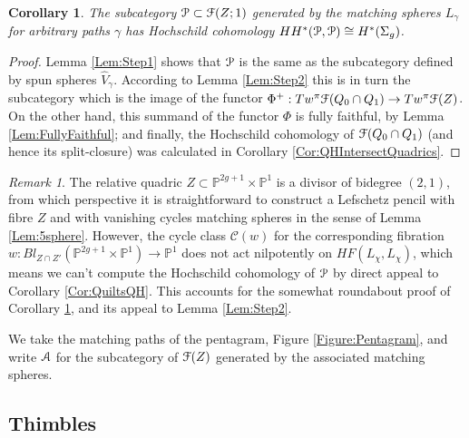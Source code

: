\documentclass[reqno,10pt]{amsart}
\numberwithin{equation}{section}
\newcommand{\bP}{{\mathbb P}}
\newcommand{\scrP}{\EuScript{P}}
\newcommand{\scrF}{\EuScript{F}}
\newcommand{\scrA}{\EuScript{A}}
\newtheorem{Corollary}[thm]{Corollary}
\theoremstyle{remark}
\newtheorem{Remark}[thm]{Remark}
\begin{document}
\begin{Corollary}\label{Cor:QHRelativeQuadric}
The subcategory  $\scrP\subset \scrF(Z;1)$ generated by the matching spheres $L_{\gamma}$ for arbitrary paths $\gamma$ has Hochschild cohomology $HH^*(\scrP,\scrP)\cong H^*(\Sigma_g)$.
\end{Corollary}

\begin{proof}
Lemma \ref{Lem:Step1} shows that $\scrP$ is the same as the subcategory defined by spun spheres $\hat{V}_{\gamma}$.  According to Lemma \ref{Lem:Step2} this is in turn the subcategory which is the image of the functor $\Phi^+: Tw^{\pi}\scrF(Q_0 \cap Q_1) \rightarrow Tw^{\pi}\scrF(Z)$.  On the other hand, this summand of the functor $\Phi$ is fully faithful, by Lemma \ref{Lem:FullyFaithful}; and finally, the Hochschild cohomology of $\scrF(Q_0 \cap Q_1)$ (and hence its split-closure) was calculated in Corollary \ref{Cor:QHIntersectQuadrics}.
\end{proof}

\begin{Remark}
The relative quadric $Z \subset \bP^{2g+1} \times \bP^1$ is a divisor of bidegree $(2,1)$, from which perspective it is straightforward to construct  a Lefschetz pencil with fibre $Z$ and with vanishing cycles matching spheres in the sense of Lemma \ref{Lem:5sphere}.  However, the cycle class $\mathcal{C}(w)$ for the corresponding fibration $w: Bl_{Z \cap Z'}(\bP^{2g+1} \times \bP^1) \rightarrow \bP^1$ does not act nilpotently on $HF(L_{\chi}, L_{\chi})$, which means we can't compute the Hochschild cohomology of $\scrP$ by direct appeal to Corollary \ref{Cor:QuiltsQH}.  This accounts for the somewhat roundabout proof of Corollary \ref{Cor:QHRelativeQuadric}, and its appeal to Lemma \ref{Lem:Step2}.  \end{Remark}





 


We take the matching paths of the pentagram, Figure \ref{Figure:Pentagram}, and write $\scrA$ for the subcategory of $\scrF(Z)$ generated by the associated matching spheres.  


\subsection{Thimbles\label{Section:Thimbles}}
\end{document}
